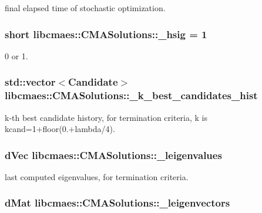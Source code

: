 final elapsed time of stochastic optimization. \hypertarget{classlibcmaes_1_1CMASolutions_a41ff8dec2ff834bcf4ddf2de86ec40fe}{
\subsubsection[{\-\_\-hsig}]{\setlength{\rightskip}{0pt plus 5cm}short libcmaes\-::\-C\-M\-A\-Solutions\-::\-\_\-hsig = 1}}\label{classlibcmaes_1_1CMASolutions_a41ff8dec2ff834bcf4ddf2de86ec40fe}
0 or 1. \hypertarget{classlibcmaes_1_1CMASolutions_a2134e163fbeceaa2c31799fad7934550}{
\subsubsection[{\-\_\-k\-\_\-best\-\_\-candidates\-\_\-hist}]{\setlength{\rightskip}{0pt plus 5cm}std\-::vector$<${\bf Candidate}$>$ libcmaes\-::\-C\-M\-A\-Solutions\-::\-\_\-k\-\_\-best\-\_\-candidates\-\_\-hist}}\label{classlibcmaes_1_1CMASolutions_a2134e163fbeceaa2c31799fad7934550}
k-\/th best candidate history, for termination criteria, k is kcand=1+floor(0.+lambda/4). \hypertarget{classlibcmaes_1_1CMASolutions_adb95177965030857649af65126c43753}{
\subsubsection[{\-\_\-leigenvalues}]{\setlength{\rightskip}{0pt plus 5cm}d\-Vec libcmaes\-::\-C\-M\-A\-Solutions\-::\-\_\-leigenvalues}}\label{classlibcmaes_1_1CMASolutions_adb95177965030857649af65126c43753}
last computed eigenvalues, for termination criteria. \hypertarget{classlibcmaes_1_1CMASolutions_ac1f790e709f5fb3e38217954bc81615d}{
\subsubsection[{\-\_\-leigenvectors}]{\setlength{\rightskip}{0pt plus 5cm}d\-Mat libcmaes\-::\-C\-M\-A\-Solutions\-::\-\_\-leigenvectors}}\label{classlibcmaes_1_1CMASolutions_ac1f790e709f5fb3e38217954bc81615d}
